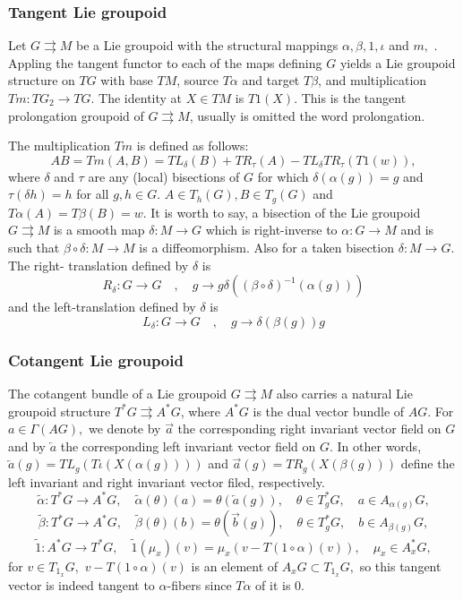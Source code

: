 \documentclass{article}
\begin{document}
\subsubsection{ Tangent Lie groupoid}

Let $G\rightrightarrows M$ be a Lie groupoid with the structural mappings  $\alpha, \beta, 1, \iota$ and $m,$ . Appling the tangent functor to each of the maps defining $G$ yields a Lie groupoid structure on $TG$  with base $TM$, source $T\alpha$ and target $T\beta$, and multiplication $Tm: TG_2\to TG$. The identity at $X \in TM$ is $T1(X)$. This is the tangent prolongation groupoid of $G \rightrightarrows M$, usually is omitted the word prolongation.

The multiplication $Tm$ is defined as follows:
$$ AB=Tm(A, B)=TL_\delta(B)+ TR_\tau(A)-TL_\delta TR_\tau(T1(w)),$$
where $\delta$ and $\tau$ are any (local) bisections of $G$ for which $\delta(\alpha (g))=g$ and $\tau(\delta h)=h$  for all $g, h \in G.$         
$A\in T_h(G), B\in T_g(G)$ and $T\alpha(A)=T\beta(B)=w.$
It is worth to say, a bisection of the Lie groupoid $G\rightrightarrows M$ is a smooth map $\delta: M \to G$ which is right-inverse to $\alpha: G \to M$ and is such that $\beta \circ \delta: M \to M$ is a diffeomorphism. Also for a taken bisection $\delta: M \to G$. The right- translation defined by $\delta$ is 
$$ R_\delta: G \to G \quad, \quad g \to g\delta((\beta\circ \delta)^{-1}(\alpha (g)))$$
and the left-translation defined by $\delta$ is 
$$ L_\delta: G \to G \quad, \quad g \to \delta(\beta (g))g$$


\subsubsection{ Cotangent Lie groupoid} \label{cotangent}

The cotangent bundle of a Lie groupoid $G\rightrightarrows M$ also carries a natural Lie groupoid structure $T^\ast G\rightrightarrows A^\ast G$, where $A^\ast G$ is the dual vector bundle of $AG.$ For $a\in \Gamma(AG),$ we denote by $\overrightarrow a$  the corresponding right invariant vector field on $G$ and by $\overleftarrow a$ the corresponding left invariant vector field on $G.$ In other words, $\overleftarrow a(g)= TL_g(T\iota(X(\alpha (g))))$ and 
$\overrightarrow a(g)=TR_g(X(\beta(g)))$ define the left invariant and right invariant vector filed, respectively.
$$\tilde{\alpha}: T^\ast G\to A^\ast G, \quad \tilde{\alpha}(\theta)(a)=\theta(\overleftarrow{a}(g)), \quad   \theta \in T^{\ast} _g G, \quad  a\in A_{\alpha(g)} G,$$
$$\tilde{\beta}: T^\ast G\to A^\ast G, \quad \tilde{\beta}(\theta)(b)=\theta(\overrightarrow{b}(g)), \quad   \theta \in T^{\ast} _g G, \quad  b\in A_{\beta(g)} G,$$
$$\tilde{1}: A^\ast G \to T^\ast G , \quad \tilde{1}(\mu_x)(v)=\mu_x(v-T(1\circ \alpha)(v)), \quad   \mu_x \in A^\ast_x G,$$
for $v\in T_{1_x} G,$ $v-T(1\circ \alpha)(v)$ is an element of $A_xG \subset T_{1_x}G,$ so this tangent vector is indeed tangent to $\alpha$-fibers since $T\alpha$ of it is $0.$
\end{document}
